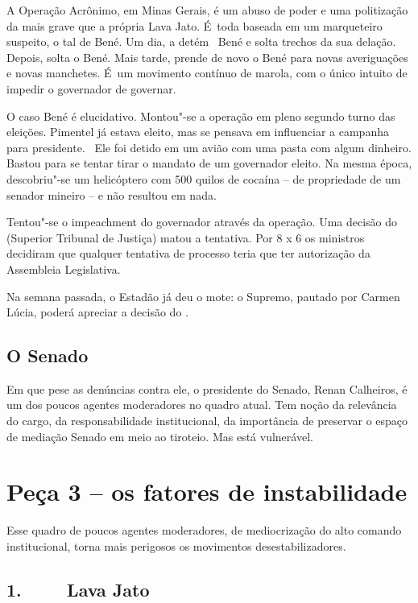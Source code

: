 A Operação Acrônimo, em Minas Gerais, é um abuso de poder e uma
politização da  mais grave que a própria Lava Jato. É~toda baseada em
um marqueteiro suspeito, o tal de Bené. Um dia, a  detém ~Bené e solta
trechos da sua delação. Depois, solta o Bené. Mais tarde, prende de novo
o Bené para novas averiguações e novas manchetes. É~um movimento
contínuo de marola, com o único intuito de impedir o governador de
governar.

O caso Bené é elucidativo. Montou"-se a operação em pleno segundo turno
das eleições. Pimentel já estava eleito, mas se pensava em influenciar a
campanha para presidente. ~Ele foi detido em um avião com uma pasta com
algum dinheiro. Bastou para se tentar tirar o mandato de um governador
eleito. Na mesma época, descobriu"-se um helicóptero com 500 quilos de
cocaína -- de propriedade de um senador mineiro -- e não resultou em
nada.

Tentou"-se o impeachment do governador através da operação. Uma decisão
do  (Superior Tribunal de Justiça) matou a tentativa. Por 8 x 6 os
ministros decidiram que qualquer tentativa de processo teria que ter
autorização da Assembleia Legislativa.

Na semana passada, o Estadão já deu o mote: o Supremo, pautado por
Carmen Lúcia, poderá apreciar a decisão do .

\subsection{O Senado}

Em que pese as denúncias contra ele, o presidente do Senado, Renan
Calheiros, é um dos poucos agentes moderadores no quadro atual. Tem
noção da relevância do cargo, da responsabilidade institucional, da
importância de preservar o espaço de mediação Senado em meio ao
tiroteio. Mas está vulnerável.

\section{Peça 3 -- os fatores de instabilidade}

Esse quadro de poucos agentes moderadores, de mediocrização do alto
comando institucional, torna mais perigosos os movimentos
desestabilizadores.

\subsection{1.~~~~ Lava Jato}

